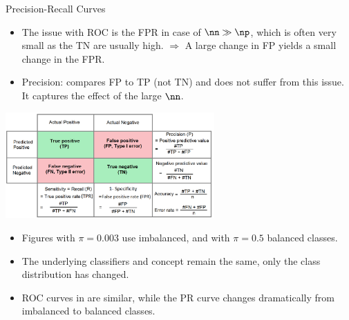 \begin{vbframe}{Precision-Recall Curves}
\framebreak

\begin{itemize}
  \item The issue with ROC is the FPR in case of $\nn \gg \np$, which is often very small as the TN are usually high. \newline
  $\Rightarrow$ A large change in FP yields a small change in the FPR.
  \item Precision: compares FP to TP (not TN) and does not suffer from this issue.
  It captures the effect of the large $\nn$.
\end{itemize}
\hspace*{\fill}\includegraphics[width=0.6\textwidth]{figure_man/roc-confusion_matrix.png}\hspace*{\fill}

\framebreak

\begin{footnotesize}
\vspace{-0.2cm}
\begin{itemize}
  \item Figures with $\pi = 0.003$ use imbalanced, and with $\pi = 0.5$ balanced classes.
  \item The underlying classifiers and concept remain the same, only the class distribution has changed.
  \item ROC curves in are similar, while the PR curve changes dramatically from imbalanced to balanced classes. 
\end{itemize}
\end{footnotesize}
\vspace{-0.4cm}


\end{vbframe}
